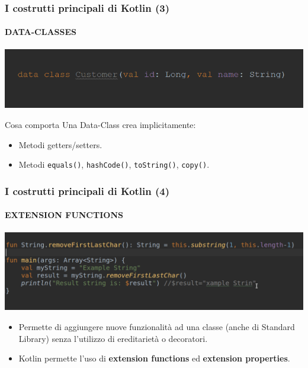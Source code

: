     \begin{frame}
      \frametitle{I costrutti principali di Kotlin (3)}
      \framesubtitle{DATA-CLASSES}
      \begin{center}
        \includegraphics[scale=0.5]{DataClass}
      \end{center}
      \begin{block}{Cosa comporta}
        Una Data-Class crea \alert{implicitamente}:
        \begin{itemize}
          \item Metodi getters/setters.
          \item Metodi \texttt{equals()}, \texttt{hashCode()}, \texttt{toString()}, \texttt{copy()}.
        \end{itemize}
      \end{block}
    \end{frame}

    \begin{frame}
      \frametitle{I costrutti principali di Kotlin (4)}
      \framesubtitle{EXTENSION FUNCTIONS}
      \begin{center}
        \includegraphics[scale=0.38]{ExtFun}
      \end{center}
      \begin{itemize}
        \item Permette di aggiungere nuove funzionalità ad una classe (anche di Standard Library) senza l'utilizzo di ereditarietà o decoratori.
        \item Kotlin permette l'uso di \textbf{extension functions} ed \textbf{extension properties}.
      \end{itemize}
    \end{frame}

